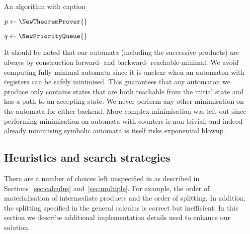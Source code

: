 \documentclass[acmsmall,review,anonymous,screen]{acmart}\settopmatter{printfolios=true,printccs=false,printacmref=true}
\theoremstyle{definition}
\begin{document}
\begin{algorithm}
  \caption{An algorithm with caption}\label{alg:baseline}

  $p \gets \NewTheoremProver{}$



  $q \gets \NewPriorityQueue{}$


  

  \end{algorithm}

It should be noted that our automata (including the successive products) are
always by construction forward- and backward- reachable-minimal. We avoid
computing fully minimal automata since it is unclear when an automaton with
registers can be safely minimised. This guarantees that any automaton we produce
only contains states that are both reachable from the initial state and has a
path to an accepting state. We never perform any other minimisation on the
automata for either backend. More complex minimisation was left out since
performing minimisation on automata with counters is non-trivial, and indeed
already minimising symbolic automata is itself risks exponential blowup
\cite{minimising-symbolic}.

\subsection{Heuristics and search strategies}

There are a number of choices left unspecified in \Calculus{} as described in
Sections~\ref{sec:calculus} and~\ref{sec:multiple}. For example, the order of
materialisation of intermediate products and the order of splitting. In
addition, the splitting specified in the general calculus is correct but
inefficient. In this section we describe additional implementation details used
to enhance our solution.
\end{document}
